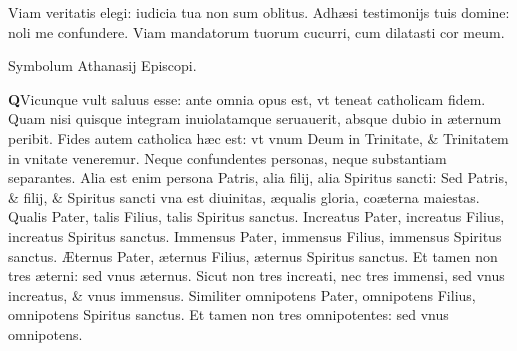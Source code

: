 \documentclass[a5paper,10pt]{book}
\def\ae{æ}
\def\AE{Æ}
\begin{document}
\begin{multicols*}{2}
\newline \color{red} V\color{black}iam veritatis elegi: iudicia tua non sum oblitus.
\newline \color{red} A\color{black}dh\ae si testimonijs tuis domine: noli me confundere.
\newline \color{red} V\color{black}iam mandatorum tuorum cucurri, cum dilatasti cor meum.
\vspace{-1em}
\begin{center} \color{red}
Symbolum Athanasij Episcopi.
\end{center}
\vspace{-1em}
\lettrine[lines=2]{\bfseries \color{red} Q}{}Vicunque vult saluus esse: ante omnia opus est, vt teneat catholicam fidem.
\newline \color{red} Q\color{black}uam nisi quisque integram inuiolatamque seruauerit, absque dubio in \ae ternum peribit.
\newline \color{red} F\color{black}ides autem catholica h\ae c est: vt vnum Deum in Trinitate, \& Trinitatem in vnitate veneremur.
\newline \color{red} N\color{black}eque confundentes personas, neque substantiam separantes.
\newline \color{red} A\color{black}lia est enim persona Patris, alia filij, alia Spiritus sancti:
\newline \color{red} S\color{black}ed Patris, \& filij, \& Spiritus sancti vna est diuinitas, \ae qualis gloria, co\ae terna maiestas.
\newline \color{red} Q\color{black}ualis Pater, talis Filius, talis Spiritus sanctus.
\newline \color{red} I\color{black}ncreatus Pater, increatus Filius, increatus Spiritus sanctus.
\newline \color{red} I\color{black}mmensus Pater, immensus Filius, immensus Spiritus sanctus.
\newline \color{red} \AE \color{black}ternus Pater, \ae ternus Filius, \ae ternus Spiritus sanctus.
\newline \color{red} E\color{black}t tamen non tres \ae terni: sed vnus \ae ternus.
\newline \color{red} S\color{black}icut non tres increati, nec tres immensi, sed vnus increatus, \& vnus immensus.
\newline \color{red} S\color{black}imiliter omnipotens Pater, omnipotens Filius, omnipotens Spiritus sanctus.
\newline \color{red} E\color{black}t tamen non tres omnipotentes: sed vnus omnipotens.

\end{multicols*}
\end{document}

